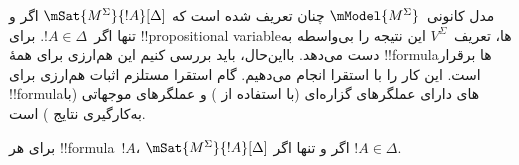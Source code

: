 \documentclass[../../../include/open-logic-section]{subfiles}
\begin{document}


مدل کانونی~$\mModel{M^\Sigma}$ چنان تعریف شده است که
$\mSat{M^\Sigma}{!A}[\Delta]$ اگر و تنها اگر~$!A \in \Delta$. برای
!!{propositional variable}ها، تعریف~$V^\Sigma$ این نتیجه را بی‌واسطه
به دست می‌دهد. بااین‌حال، باید بررسی کنیم این هم‌ارزی برای همهٔ
!!{formula}ها برقرار است. این کار را با استقرا انجام می‌دهیم. گام
استقرا مستلزم اثبات هم‌ارزی برای !!{formula}های دارای عملگرهای گزاره‌ای
(با استفاده از ) و عملگرهای موجهاتی
(با به‌کارگیری نتایج ) است.

\begin{prop}[لم صدق]
  برای هر !!{formula}~$!A$، $\mSat{M^\Sigma}{!A}[\Delta]$ اگر و تنها اگر
  $!A \in \Delta$.
\end{prop}
\end{document}

